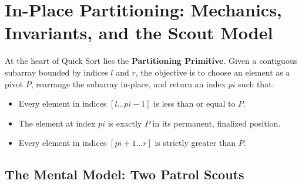 \documentclass[10pt,journal,compsoc,onecolumn]{IEEEtran}
\begin{document}
\section{In-Place Partitioning: Mechanics, Invariants, and the Scout Model}
\label{sec:partitioning}

At the heart of Quick Sort lies the \textbf{Partitioning Primitive}. Given a contiguous subarray bounded by indices $l$ and $r$, the objective is to choose an element as a pivot $P$, rearrange the subarray in-place, and return an index $pi$ such that:
\begin{itemize}
    \item Every element in indices $[l \dots pi - 1]$ is less than or equal to $P$.
    \item The element at index $pi$ is exactly $P$ in its permanent, finalized position.
    \item Every element in indices $[pi + 1 \dots r]$ is strictly greater than $P$.
\end{itemize}

\subsection{The Mental Model: Two Patrol Scouts}
\end{document}
